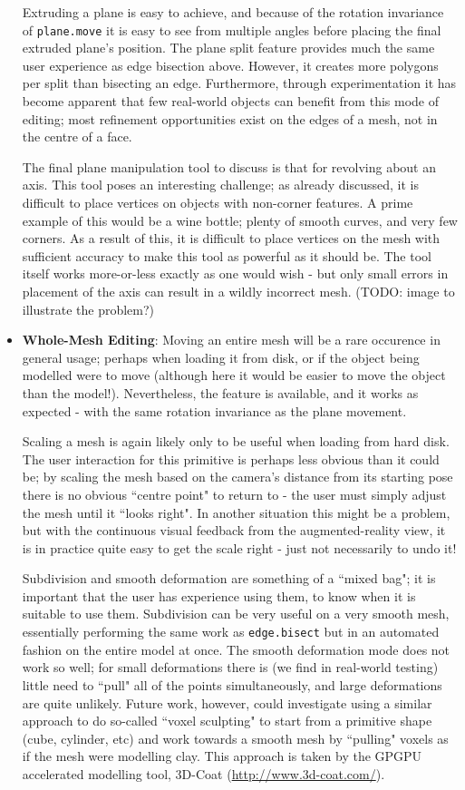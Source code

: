 \documentclass[a4paper,10pt]{article}
\begin{document}
\begin{itemize}
{Extruding a plane is easy to achieve, and because of the rotation invariance of \texttt{plane.move} it is easy to see from multiple angles before placing the final extruded plane's position. The plane split feature provides much the same user experience as edge bisection above. However, it creates more polygons per split than bisecting an edge. Furthermore, through experimentation it has become apparent that few real-world objects can benefit from this mode of editing; most refinement opportunities exist on the edges of a mesh, not in the centre of a face.

The final plane manipulation tool to discuss is that for revolving about an axis. This tool poses an interesting challenge; as already discussed, it is difficult to place vertices on objects with non-corner features. A prime example of this would be a wine bottle; plenty of smooth curves, and very few corners. As a result of this, it is difficult to place vertices on the mesh with sufficient accuracy to make this tool as powerful as it should be. The tool itself works more-or-less exactly as one would wish - but only small errors in placement of the axis can result in a wildly incorrect mesh. (TODO: image to illustrate the problem?)
}

\item{\textbf{Whole-Mesh Editing}: Moving an entire mesh will be a rare occurence in general usage; perhaps when loading it from disk, or if the object being modelled were to move (although here it would be easier to move the object than the model!). Nevertheless, the feature is available, and it works as expected - with the same rotation invariance as the plane movement.

Scaling a mesh is again likely only to be useful when loading from hard disk. The user interaction for this primitive is perhaps less obvious than it could be; by scaling the mesh based on the camera's distance from its starting pose there is no obvious ``centre point" to return to - the user must simply adjust the mesh until it ``looks right". In another situation this might be a problem, but with the continuous visual feedback from the augmented-reality view, it is in practice quite easy to get the scale right - just not necessarily to undo it!

Subdivision and smooth deformation are something of a ``mixed bag"; it is important that the user has experience using them, to know when it is suitable to use them. Subdivision can be very useful on a very smooth mesh, essentially performing the same work as \texttt{edge.bisect} but in an automated fashion on the entire model at once. The smooth deformation mode does not work so well; for small deformations there is (we find in real-world testing) little need to ``pull" all of the points simultaneously, and large deformations are quite unlikely. Future work, however, could investigate using a similar approach to do so-called ``voxel sculpting" to start from a primitive shape (cube, cylinder, etc) and work towards a smooth mesh by ``pulling" voxels as if the mesh were modelling clay. This approach is taken by the GPGPU accelerated modelling tool, 3D-Coat (\url{http://www.3d-coat.com/}).
}


\end{itemize}
\end{document}
